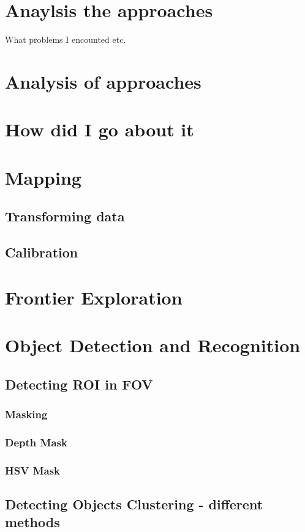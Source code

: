 \documentclass{mproj}
\begin{document}
\section{Anaylsis the approaches}

What problems I encounted etc.

\section{Analysis of approaches}
\section{How did I go about it}

\section{Mapping}
\subsection{Transforming data}
\subsection{Calibration}

\section{Frontier Exploration}

\section{Object Detection and Recognition}
\subsection{Detecting ROI in FOV}
\subsubsection{Masking}
\subsubsection{Depth Mask}
\subsubsection{HSV Mask}
\subsection{Detecting Objects Clustering - different methods}
\end{document}
